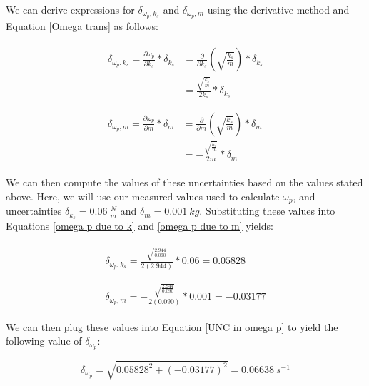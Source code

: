 \documentclass[12pt]{article}
\begin{document}
We can derive expressions for $\delta_{\omega_p,k_s}$ and $\delta_{\omega_p,m}$ using the derivative method and Equation \ref{Omega trans} as follows:

\begin{align}
    \begin{split}
        \delta_{\omega_p,k_s}=\frac{\partial\omega_p}{\partial k_s}*\delta_{k_s}&=\frac{\partial}{\partial k_s}(\sqrt{\frac{k_s}{m}})*\delta_{k_s} \\
        &=\frac{\sqrt{\frac{k_s}{m}}}{2k_s}*\delta_{k_s}\label{omega p due to k}
    \end{split} \\ \nonumber \\
    \begin{split}
        \delta_{\omega_p,m}=\frac{\partial\omega_p}{\partial m}*\delta_m&=\frac{\partial}{\partial m}(\sqrt{\frac{k_s}{m}})*\delta_{m} \\
        &=-\frac{\sqrt{\frac{k_s}{m}}}{2m}*\delta_m\label{omega p due to m}
    \end{split}
\end{align}

We can then compute the values of these uncertainties based on the values stated above. Here, we will use our measured values used to calculate $\omega_p$, and uncertainties $\delta_{k_s}=0.06\ \frac{N}{m}$ and $\delta_m=0.001\ kg$. Substituting these values into Equations \ref{omega p due to k} and \ref{omega p due to m} yields:

\begin{align*}
    \begin{split}
        \delta_{\omega_p,k_s}=\frac{\sqrt{\frac{2.944}{0.090}}}{2(2.944)}*0.06=0.05828
    \end{split} \\ \\
    \begin{split}
        \delta_{\omega_p,m}=-\frac{\sqrt{\frac{2.944}{0.090}}}{2(0.090)}*0.001=-0.03177
    \end{split}
\end{align*}

We can then plug these values into Equation \ref{UNC in omega p} to yield the following value of $\delta_{\omega_p}$:

\begin{equation*}
    \delta_{\omega_p}=\sqrt{0.05828^2+(-0.03177)^2}=0.06638\ s^{-1}
\end{equation*}
\end{document}
